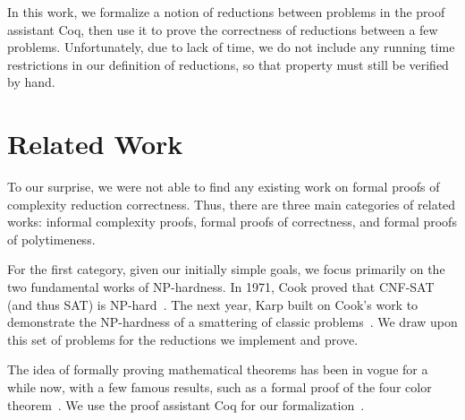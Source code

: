 \documentclass{article}
\begin{document}
In this work, we formalize a notion of reductions between problems in the proof
assistant Coq, then use it to prove the correctness of reductions between a few
problems. Unfortunately, due to lack of time, we do not include any running time
restrictions in our definition of reductions, so that property must still be
verified by hand.

\section{Related Work}

To our surprise, we were not able to find any existing work on formal proofs of
complexity reduction correctness. Thus, there are three main categories of
related works: informal complexity proofs, formal proofs of correctness, and
formal proofs of polytimeness.

For the first category, given our initially simple goals, we focus primarily on
the two fundamental works of NP-hardness. In 1971, Cook proved that CNF-SAT (and
thus SAT) is NP-hard~\cite{cook1971}. The next year, Karp built on Cook's work
to demonstrate the NP-hardness of a smattering of classic
problems~\cite{karp1972}. We draw upon this set of problems for the reductions
we implement and prove.

The idea of formally proving mathematical theorems has been in vogue for a while
now, with a few famous results, such as a formal proof of the four color
theorem~\cite{gonthier2008}. We use the proof assistant Coq for our
formalization~\cite{coq2019}.
\end{document}
